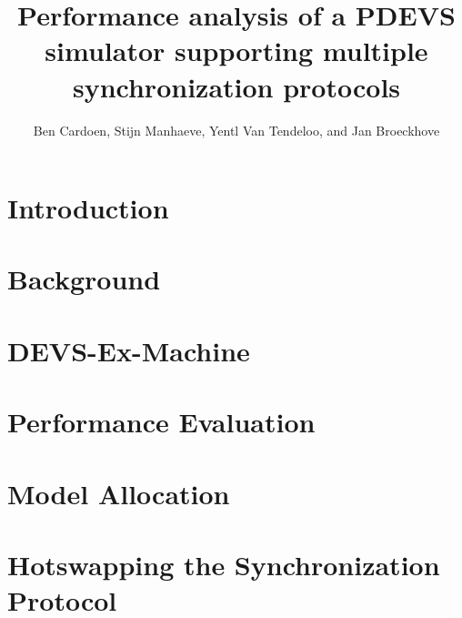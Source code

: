 \documentclass{sagej}
\begin{document}
\title{Performance analysis of a PDEVS simulator supporting multiple synchronization protocols}

\author{Ben Cardoen, Stijn Manhaeve, Yentl Van Tendeloo, and Jan Broeckhove}




\begin{abstract}

\end{abstract}

\maketitle

\section{Introduction}
\label{sec:1-introduction}


\section{Background}
\label{sec:2-background}


\section{DEVS-Ex-Machine}
\label{sec:3-features}


\section{Performance Evaluation}
\label{sec:4-performance}


\section{Model Allocation}
\label{sec:4a-allocation}


\section{Hotswapping the Synchronization Protocol}
\label{sec:4b-hotswap}

\end{document}
